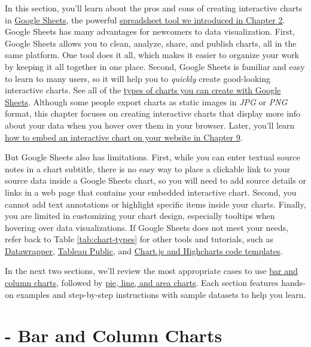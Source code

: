 \documentclass[
  english,
]{book}
\begin{document}
In this section, you'll learn about the pros and cons of creating interactive charts in \href{https://sheets.google.com}{Google Sheets}, the powerful \href{spreadsheet.html}{spreadsheet tool we introduced in Chapter 2}. Google Sheets has many advantages for newcomers to data visualization. First, Google Sheets allows you to clean, analyze, share, and publish charts, all in the same platform. One tool does it all, which makes it easier to organize your work by keeping it all together in one place. Second, Google Sheets is familiar and easy to learn to many users, so it will help you to \emph{quickly} create good-looking interactive charts. See all of the \href{https://support.google.com/docs/answer/190718}{types of charts you can create with Google Sheets}. Although some people export charts as static images in \emph{JPG} or \emph{PNG} format, this chapter focuses on creating interactive charts that display more info about your data when you hover over them in your browser. Later, you'll learn \href{embed.html}{how to embed an interactive chart on your website in Chapter 9}.

But Google Sheets also has limitations. First, while you can enter textual source notes in a chart subtitle, there is no easy way to place a clickable link to your source data inside a Google Sheets chart, so you will need to add source details or links in a web page that contains your embedded interactive chart. Second, you cannot add text annotations or highlight specific items inside your charts. Finally, you are limited in customizing your chart design, especially tooltips when hovering over data visualizations. If Google Sheets does not meet your needs, refer back to Table \ref{tab:chart-types} for other tools and tutorials, such as \href{chart-datawrapper.html}{Datawrapper}, \href{chart-tableau.html}{Tableau Public}, and \href{chartcode.html}{Chart.js and Highcharts code templates}.

In the next two sections, we'll review the most appropriate cases to use \href{bar-column-google.html}{bar and column charts}, followed by \href{pie-line-area-google.html}{pie, line, and area charts}. Each section features hands-on examples and step-by-step instructions with sample datasets to help you learn.

\hypertarget{bar-column-google}{%
\section*{- Bar and Column Charts}\label{bar-column-google}}
\end{document}
